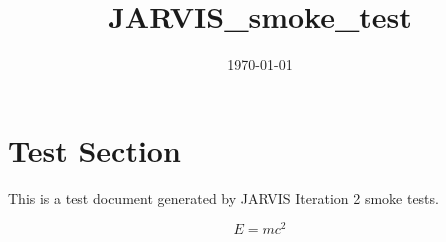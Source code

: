 \documentclass{article}
\title{JARVIS\_smoke\_test}
\date{\today}
\begin{document}
\maketitle

\section*{Test Section}
This is a test document generated by JARVIS Iteration 2 smoke tests.

\[E = mc^2\]
\end{document}
